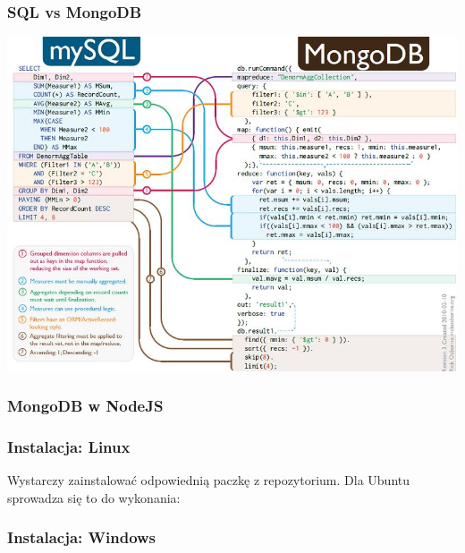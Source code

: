 \documentclass{beamer}
\begin{document}
  \begin{frame}
    \frametitle{SQL vs MongoDB}
    \includegraphics[width=\textwidth,keepaspectratio]{img/mysql_vs_mongodb.jpg}
  \end{frame}

  \begin{frame}
    \frametitle{MongoDB w NodeJS}
    
  \end{frame}

  \begin{frame}
    \frametitle{Instalacja: Linux}
    Wystarczy zainstalować odpowiednią paczkę z repozytorium. Dla Ubuntu sprowadza się to do wykonania:

    
  \end{frame}

  \begin{frame}
    \frametitle{Instalacja: Windows}
  \end{frame}
\end{document}
